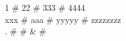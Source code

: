\begin{tabbing}
	1   # 22  # 333   # 4444     \\
	xxx # aaa # yyyyy # zzzzzzzz \\
	.   #     # &     #          \\
\end{tabbing}
